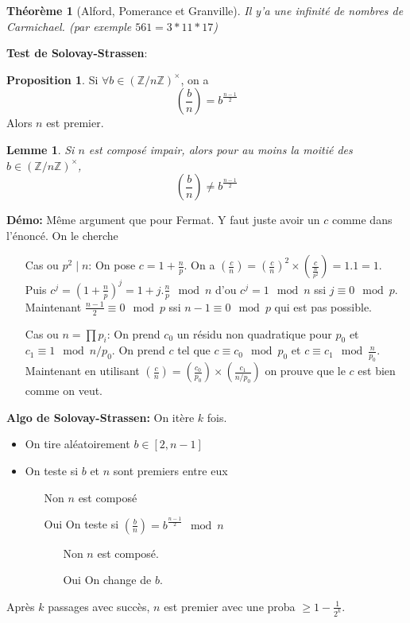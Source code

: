 \documentclass[12pt]{article}
\theoremstyle{plain}
\newtheorem{thm}[subsubsection]{Th\'eor\`eme}
\newtheorem{lem}[subsubsection]{Lemme}
\theoremstyle{definition}
\newtheorem{prop}[subsubsection]{Proposition}
\newcommand{\Z}{\mathbb{Z}}
\begin{document}
\begin{thm}[Alford, Pomerance et Granville]
    Il y'a une infinité de nombres de Carmichael. (par 
    exemple \(561=3*11*17\))
\end{thm}
\newpage
\textbf{Test de Solovay-Strassen}:
\begin{prop}
    Si $\forall b\in(\Z/n\Z)^{\times}$, on a 
    \[\left(\frac{b}{n}\right)=b^{\frac{n-1}{2}}\]
    Alors $n$ est premier.
\end{prop}
\begin{lem}
    Si $n$ est composé impair, alors pour au moins 
    la moitié des $b\in(\Z/n\Z)^{\times}$,
    \[\left(\frac{b}{n}\right)\neq b^{\frac{n-1}{2}}\]
\end{lem}
\noindent \textbf{Démo:} Même argument que pour Fermat. Y faut 
juste avoir un \(c\) comme dans l'énoncé. On le cherche
\begin{itemize}
    \item[Cas ou $p^2\mid n$:] On pose $c=1+\frac{n}{p}$.
On a $\left(\frac{c}{n}\right)=\left(\frac{c}{n}\right)^2\times
\left(\frac{c}{\frac{n}{p^2}}\right)=1.1=1$.
 Puis $c^j=(1+\frac{n}{p})^j=1+j.\frac{n}{p}\mod n$ d'ou 
 $c^j=1\mod n$ ssi $j\equiv 0\mod p$. Maintenant 
 $\frac{n-1}{2}\equiv 0\mod p$ ssi $n-1\equiv0\mod p$ qui 
 est pas possible.
    \item[Cas ou $n=\prod p_i$:] On prend $c_0$ un résidu
non quadratique pour $p_0$ et $c_1\equiv 1\mod n/p_0$. 
On prend $c$ tel que $c\equiv c_0\mod p_0$ et 
$c\equiv c_1\mod \frac{n}{p_0}$. Maintenant en utilisant 
$\left(\frac{c}{n}\right)=\left(\frac{c_0}{p_0}\right)
\times\left(\frac{c_1}{n/p_0}\right)$ on prouve que le 
$c$ est bien comme on veut.
\end{itemize}

\noindent\textbf{Algo de Solovay-Strassen:} On itère $k$ fois.
\begin{itemize}
    \item On tire aléatoirement $b\in[2,n-1]$
    \item On teste si $b$ et $n$ sont premiers entre eux 
    \begin{itemize}
        \item[Non] $n$ est composé
        \item[Oui] On teste si $\left(\frac{b}{n}\right)
        =b^{\frac{n-1}{2}}\mod n$
        \begin{itemize}
            \item[Non] $n$ est composé.
            \item[Oui] On change de $b$.
        \end{itemize}
    \end{itemize}
\end{itemize}
Après $k$ passages avec succès, $n$ est premier avec 
une proba $\geq 1-\frac{1}{2^k}$.\\
\end{document}
